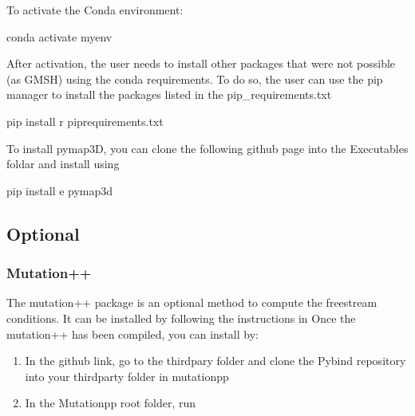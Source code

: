 \documentclass[letterpaper,10pt,english]{sphinxmanual}
\begin{document}
\sphinxAtStartPar
To activate the Conda environment:

\begin{sphinxVerbatim}[commandchars=\\\{\}]
conda activate myenv
\end{sphinxVerbatim}

\sphinxAtStartPar
After activation, the user needs to install other packages that were not possible (as GMSH) using the conda requirements. To do so,
the user can use the pip manager to install the packages listed in the pip\_requirements.txt

\begin{sphinxVerbatim}[commandchars=\\\{\}]
 pip install \PYGZhy{}r pip\PYGZus{}requirements.txt
\end{sphinxVerbatim}

\sphinxAtStartPar
To install pymap3D, you can clone the following github page  into the Executables foldar and install using

\begin{sphinxVerbatim}[commandchars=\\\{\}]
 pip install \PYGZhy{}e pymap3d
\end{sphinxVerbatim}


\subsection{Optional}
\label{\detokenize{usage:optional}}

\subsubsection{Mutation++}
\label{\detokenize{usage:mutation}}
\sphinxAtStartPar
The mutation++ package is an optional method to compute the freestream conditions. It can be installed by following the instructions in 
Once the mutation++ has been compiled, you can install by:
\begin{enumerate}
%
\item {} 
\sphinxAtStartPar
In the github link, go to the thirdpary folder and clone the Pybind repository into your thirdparty folder in mutationpp

\item {} 
\sphinxAtStartPar
In the Mutationpp root folder, run

\end{enumerate}
\end{document}
